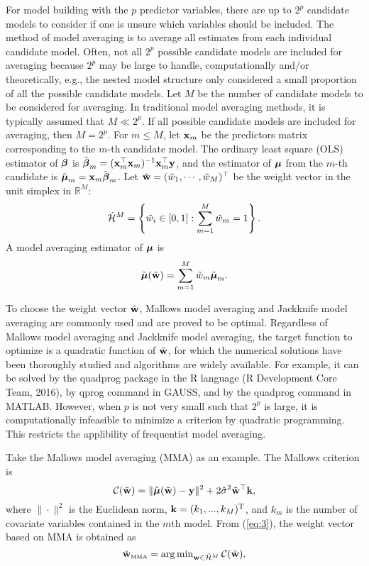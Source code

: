 \documentclass[12pt,hidelinks]{article}
\begin{document}
For model building with the $p$ predictor variables, there are up to
$2^p$ candidate models to consider if one is unsure which variables
should be included. The method of model averaging is to average all
estimates from each individual candidate model. Often, not all $2^p$
possible candidate models are included for averaging because $2^p$ may
be large to handle, computationally and/or theoretically, e.g., the
nested model structure \citep{Hansen:07, Hansen:12} only considered a
small proportion of all the possible candidate models. Let $M$ be the
number of candidate models to be considered for averaging. In
traditional model averaging methods, it is typically assumed that
$M\ll 2^p$. If all possible candidate models are included for
averaging, then $M=2^p$. For $m\leq M$, let $\mathbf{x}_m$ be the predictors
matrix corresponding to the $m$-th candidate model. The ordinary least
square (OLS) estimator of $\boldsymbol{\beta}$ is
$\tilde{\boldsymbol{\beta}}_m = (\mathbf{x}_m^{\top}\mathbf{x}_m)^{-1}\mathbf{x}_m^{\top}\mathbf{y}$, and the
estimator of $\boldsymbol{\mu}$ from the $m$-th candidate is
$\tilde{\boldsymbol{\mu}}_m=\mathbf{x}_m\tilde{\boldsymbol{\beta}}_m$.  Let
$\tilde{\mathbf{w}} = (\tilde{w}_1,\cdots,\tilde{w}_M)^{\top}$ be the weight
vector in the unit simplex in $\mathbb{R}^M$:
\begin{equation}\label{weight}
  \tilde{\cal{H}}^M=\left\{\tilde{w}_i\in [0,1]:
    \sum_{m=1}^M \tilde{w}_m=1\right\}.
\end{equation}
A model averaging estimator of $\boldsymbol{\mu}$ is
\begin{equation}\label{eq:2}
  \tilde{\boldsymbol{\mu}}(\tilde{\mathbf{w}}) =
\sum_{m=1}^M\tilde{w}_m\tilde{\boldsymbol{\mu}}_m.
\end{equation}

To choose the weight vector $\tilde{\mathbf{w}}$, Mallows model averaging \citep{Hansen:07} and Jackknife model averaging \citep{Hansen:12} are commonly used and are proved to be optimal.
Regardless of Mallows model averaging and Jackknife model averaging, the target function to optimize is a quadratic function of $\tilde{\mathbf{w}}$, for which the numerical solutions have been thoroughly studied and algorithms are widely available. For example, it can be solved by the quadprog package in the R language (R Development Core Team, 2016),  by qprog command in GAUSS, and by the quadprog command in MATLAB.
However, when $p$ is not very small such that $2^p$ is large, it is computationally infeasible to minimize a criterion by quadratic programming. This restricts the applibility of frequentist model averaging. 
 
Take the Mallows model averaging (MMA) \citep{Hansen:07} as an example. 
The Mallows criterion is
\begin{equation}\label{eq:3}
{\cal C}(\tilde{\mathbf{w}})=\|\hat{\boldsymbol{\mu}}(\tilde{\mathbf{w}})-\mathbf{y}\|^2+2\hat{\sigma}^2 \tilde{\mathbf{w}}^{\top}\mathbf{k},
\end{equation}
where $\|\cdot\|^2$ is the Euclidean norm, $\mathbf{k}=(k_1, ..., k_M)^{\rm T}$, and $k_m$ is the number of covariate variables contained in the $m$th model. From (\ref{eq:3}), the weight vector based on MMA is obtained as
\begin{equation*}
  \tilde{\mathbf{w}}_{{\mbox{\tiny\rm MMA}}}= \mathop{\arg\min}\nolimits_{\mathbf{w} \in\tilde{\cal{H}}^M}{{\cal C}}(\tilde{\mathbf{w}}).
\end{equation*} 
\end{document}
